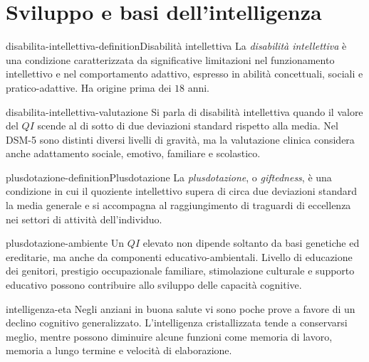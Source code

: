 \documentclass[preview]{standalone}
\begin{document}
\genpage

\section{Sviluppo e basi dell'intelligenza}

\begin{snippetdefinition}{disabilita-intellettiva-definition}{Disabilità intellettiva}
    La \emph{disabilità intellettiva} è una condizione caratterizzata da
    significative limitazioni nel funzionamento intellettivo e nel comportamento
    adattivo, espresso in abilità concettuali, sociali e pratico-adattive. Ha
    origine prima dei \(18\) anni.
\end{snippetdefinition}

\begin{snippet}{disabilita-intellettiva-valutazione}
    Si parla di disabilità intellettiva quando il valore del \(QI\) scende al di
    sotto di due deviazioni standard rispetto alla media. Nel DSM-5 sono
    distinti diversi livelli di gravità, ma la valutazione clinica considera
    anche adattamento sociale, emotivo, familiare e scolastico.
\end{snippet}

\begin{snippetdefinition}{plusdotazione-definition}{Plusdotazione}
    La \emph{plusdotazione}, o \emph{giftedness}, è una condizione in cui il
    quoziente intellettivo supera di circa due deviazioni standard la media
    generale e si accompagna al raggiungimento di traguardi di eccellenza nei
    settori di attività dell'individuo.
\end{snippetdefinition}

\begin{snippet}{plusdotazione-ambiente}
    Un \(QI\) elevato non dipende soltanto da basi genetiche ed ereditarie, ma
    anche da componenti educativo-ambientali. Livello di educazione dei genitori,
    prestigio occupazionale familiare, stimolazione culturale e supporto
    educativo possono contribuire allo sviluppo delle capacità cognitive.
\end{snippet}

\begin{snippet}{intelligenza-eta}
    Negli anziani in buona salute vi sono poche prove a favore di un declino
    cognitivo generalizzato. L'intelligenza cristallizzata tende a conservarsi
    meglio, mentre possono diminuire alcune funzioni come memoria di lavoro,
    memoria a lungo termine e velocità di elaborazione.
\end{snippet}
\end{document}
